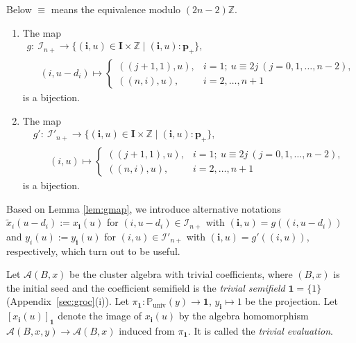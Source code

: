\begin{Lemma}
\label{lem:gmap}
Below $\equiv$ means the equivalence modulo $(2n-2)\mathbb{Z}$.

\begin{enumerate}\itemsep=0pt
\item[$(i)$]
The map
\begin{gather*}
g:  \ \mathcal{I}_{n+} \rightarrow
\{ (\mathbf{i},u)\in \mathbf{I}\times \mathbb{Z} \mid
(\mathbf{i},u): \mathbf{p}_+
\}, \\
\phantom{g: \ } \ (i,u-d_i) \mapsto
\begin{cases}
((j+1,1),u), & i= 1; \
u \equiv 2j
\ (j=0,1,\dots,n-2),\\
((n,i),u), & i=2,\dots,n+1
\end{cases}
\end{gather*}
is a bijection.

\item[$(ii)$]
The map
\begin{gather*}
g': \  \mathcal{I}'_{n+} \rightarrow
\{ (\mathbf{i},u)\in \mathbf{I}\times \mathbb{Z} \mid
 (\mathbf{i},u): \mathbf{p}_+
\}, \\
\phantom{g': \ }{} \  (i,u) \mapsto
\begin{cases}
((j+1,1),u), & i= 1;\
u\equiv 2j
\ (j=0,1,\dots,n-2), \\
((n,i),u), &  i=2,\dots,n+1
\end{cases}
\end{gather*}
is a bijection.
\end{enumerate}
\end{Lemma}

Based on Lemma \ref{lem:gmap},
we introduce alternative notations
$\tilde{x}_i(u-d_i):=x_{\mathbf{i}}(u)$
for $(i,u-d_i)\in \mathcal{I}_{n+}$
with $(\mathbf{i},u)=g((i,u-d_i))$
and
$y_i(u):=y_{\mathbf{i}}(u)$
for $(i,u)\in \mathcal{I}'_{n+}$
with $(\mathbf{i},u)=g'((i,u))$,
respectively,
which turn out to be useful.

 Let $\mathcal{A}(B,x)$ be the cluster algebra
with trivial coef\/f\/icients, where $(B,x)$ is
the initial seed
and the coef\/f\/icient semif\/ield
is the {\em trivial semifield\/}
 $\mathbf{1}=\{1\}$ (Appendix~\ref{sec:groc}(i)).
Let $\pi_{\mathbf{1}}:
\mathbb{P}_{\mathrm{univ}}(y)\rightarrow
\mathbf{1}$, $y_{\mathbf{i}}\mapsto 1$ be the projection.
Let $[x_{\mathbf{i}}(u)]_{\mathbf{1}}$
denote the image of $x_{\mathbf{i}}(u)$
 by the algebra homomorphism
$\mathcal{A}(B,x,y)\rightarrow \mathcal{A}(B,x)$
 induced from $\pi_{\mathbf{1}}$.
It is called the {\em trivial evaluation}.




